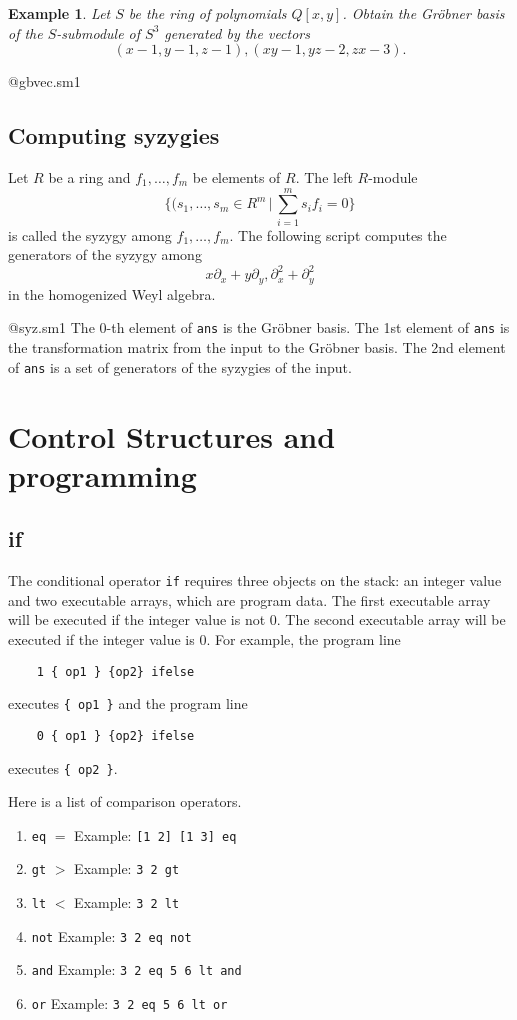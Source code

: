 \documentclass{article}
\def\pd#1{ \partial_{#1} }
\newtheorem{example}{Example}
\begin{document}
\begin{example}
Let $S$ be the ring of polynomials
$Q [x,y]$.
Obtain the Gr\"obner basis of the $S$-submodule of $S^3$
generated by the vectors
$$ (x-1,y-1,z-1), (xy-1,yz-2,zx-3). $$
\end{example}

@gbvec.sm1
\bigbreak

\subsection{Computing syzygies}

Let $R$ be a ring and $f_1, \ldots, f_m$ be elements of $R$.
The left $R$-module 
$$ \{ (s_1, \ldots, s_m \in R^m \,|\, \sum_{i=1}^m s_i f_i = 0 \} $$
is called the syzygy among $f_1, \ldots, f_m$.
The following script computes the generators of the syzygy
among
$$ x \pd{x} + y \pd{y},
   \pd{x}^2+\pd{y}^2
$$
in the homogenized Weyl algebra.

@syz.sm1
The 0-th element of {\tt ans} is the Gr\"obner basis.
The 1st element of {\tt ans} is the transformation matrix from the input
to the Gr\"obner basis.
The 2nd element of {\tt ans} is a set of generators of the syzygies
of the input.

\bigbreak


\section{Control Structures and programming}

\subsection{if}
The conditional operator {\tt if} requires three objects on the stack:
an integer value and two executable arrays, which are program data.
The first executable array will be executed if the integer value is not 0.
The second executable array will be executed if the integer value is 0.
For example, the program line
\begin{verbatim}
    1 { op1 } {op2} ifelse
\end{verbatim}
executes {\tt \{ op1 \}} and the program line
\begin{verbatim}
    0 { op1 } {op2} ifelse
\end{verbatim}
executes {\tt \{ op2 \}}.

Here is a list of comparison operators.
\begin{enumerate}
\item[] {\tt eq} \quad $=$ \quad  Example: {\tt [1 2] [1 3] eq }
\item[] {\tt gt} \quad $>$ \quad  Example: {\tt 3 2 gt}
\item[] {\tt lt} \quad $<$ \quad  Example: {\tt 3 2 lt}
\item[] {\tt not}  \quad  Example: {\tt 3 2 eq not}
\item[] {\tt and}  \quad  Example: {\tt 3 2 eq 5 6 lt and }
\item[] {\tt or}  \quad  Example: {\tt 3 2 eq 5 6 lt or }
\end{enumerate}
\end{document}
